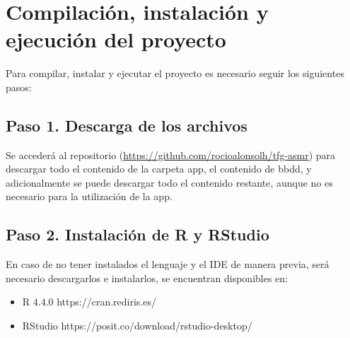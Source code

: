 \documentclass[a4paper,12pt,twoside]{memoir}
\begin{document}
\section{Compilación, instalación y ejecución del proyecto}
Para compilar, instalar y ejecutar el proyecto es necesario seguir los siguientes pasos:
\subsection{Paso 1. Descarga de los archivos}
Se accederá al repositorio (\url{https://github.com/rocioalonsolh/tfg-asmr}) para descargar todo el contenido de la carpeta app, el contenido de bbdd, y adicionalmente se puede descargar todo el contenido restante, aunque no es necesario para la utilización de la app.
\subsection{Paso 2. Instalación de R y RStudio}
En caso de no tener instalados el lenguaje y el IDE de manera previa, será necesario descargarlos e instalarlos, se encuentran disponibles en:
\begin{itemize}
    \item R 4.4.0 https://cran.rediris.es/
    \item RStudio https://posit.co/download/rstudio-desktop/
\end{itemize}
\end{document}
